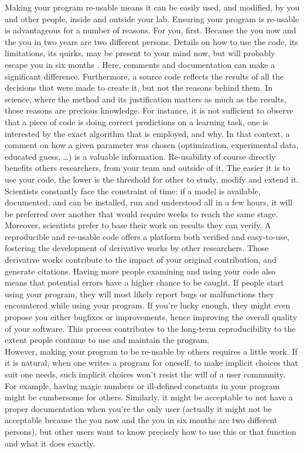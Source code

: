 \documentclass[a4paper,11pt]{article}
\begin{document}
Making your program re-usable means it can be easily used, and modified, by you and other people, inside and outside your lab. Ensuring your program is re-usable is advantageous for a number of reasons.
%
For you, first. Because the you now and the you in two years are two different persons. Details on how to use the code, its limitations, its quirks, may be present to your mind now, but will probably escape you in six months \parencite{Donoho:2009}. Here, comments and documentation can make a significant difference.
%
Furthermore, a source code reflects the results of all the decisions that were made to create it, but not the reasons behind them. In science, where the method and its justification matters as much as the results, those reasons are precious knowledge. For instance, it is not sufficient to observe that a piece of code is doing correct predictions on a learning task, one is interested by the exact algorithm that is employed, and why. In that context, a comment on how a given parameter was chosen (optimization, experimental data, educated guess, …) is a valuable information.
%
Re-usability of course directly benefits others researchers, from your team and outside of it. The easier it is to use your code, the lower is the threshold for other to study, modify and extend it. Scientists constantly face the constraint of time: if a model is available, documented, and can be installed, run and understood all in a few hours, it will be preferred over another that would require weeks to reach the same stage.
%
Moreover, scientists prefer to base their work on results they can verify. A reproducible and re-usable code offers a platform both verified and easy-to-use, fostering the development of derivative works by other researchers. Those derivative works contribute to the impact of your original contribution, and generate citations.
%
Having more people examining and using your code also means that potential errors have a higher chance to be caught. If people start using your program, they will most likely report bugs or malfunctions they encountered while using your program. If you're lucky enough, they might even propose you either bugfixes or improvements, hence improving the overall quality of your software. This process contributes to the long-term reproducibility to the extent people continue to use and maintain the program.\\

However, making your program to be re-usable by others requires a little work. If it is natural, when one writes a program for oneself, to make implicit choices that suit one needs, such implicit choices won't resist the will of a user community. For example, having magic numbers or ill-defined constants in your program might be cumbersome for others. Similarly, it might be acceptable to not have a proper documentation when you're the only user (actually it might not be acceptable because the you now and the you in six months are two different persons), but other users want to know precisely how to use this or that function and what it does exactly.
\end{document}

